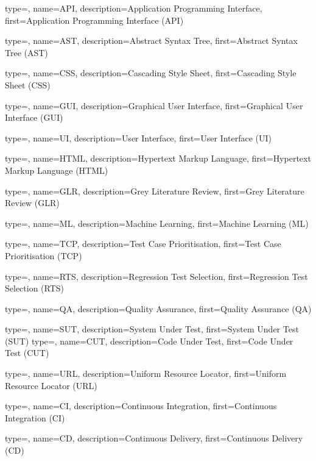 
{
	type=\acronymtype,
	name={API},
	description={Application Programming Interface},
	first={Application Programming Interface (API)}
}

{
	type=\acronymtype,
	name={AST},
	description={Abstract Syntax Tree},
	first={Abstract Syntax Tree (AST)}
}

{
	type=\acronymtype,
	name={CSS},
	description={Cascading Style Sheet},
	first={Cascading Style Sheet (CSS)}
}

{
	type=\acronymtype,
	name={GUI},
	description={Graphical User Interface},
	first={Graphical User Interface (GUI)}
}

{
	type=\acronymtype,
	name={UI},
	description={User Interface},
	first={User Interface (UI)}
}

{
	type=\acronymtype,
	name={HTML},
	description={Hypertext Markup Language},
	first={Hypertext Markup Language (HTML)}
}

{
	type=\acronymtype,
	name={GLR},
	description={Grey Literature Review},
	first={Grey Literature Review (GLR)}
}

{
	type=\acronymtype,
	name={ML},
	description={Machine Learning},
	first={Machine Learning (ML)}
}

{
	type=\acronymtype,
	name={TCP},
	description={Test Case Prioritisation},
	first={Test Case Prioritisation (TCP)}
}

{
	type=\acronymtype,
	name={RTS},
	description={Regression Test Selection},
	first={Regression Test Selection (RTS)}
}

{
	type=\acronymtype,
	name={QA},
	description={Quality Assurance},
	first={Quality Assurance (QA)}
}

{
	type=\acronymtype,
	name={SUT},
	description={System Under Test},
	first={System Under Test (SUT)}
}
{
	type=\acronymtype,
	name={CUT},
	description={Code Under Test},
	first={Code Under Test (CUT)}
}

{
	type=\acronymtype,
	name={URL},
	description={Uniform Resource Locator},
	first={Uniform Resource Locator (URL)}
}

{
	type=\acronymtype,
	name={CI},
	description={Continuous Integration},
	first={Continuous Integration (CI)}
}

{
	type=\acronymtype,
	name={CD},
	description={Continuous Delivery},
	first={Continuous Delivery (CD)}
}

